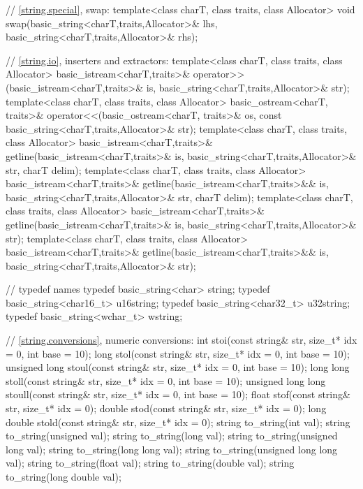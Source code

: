 \begin{codeblock}
{  // \ref{string.special}, swap:
  template<class charT, class traits, class Allocator>
    void swap(basic_string<charT,traits,Allocator>& lhs,
      basic_string<charT,traits,Allocator>& rhs);

  // \ref{string.io}, inserters and extractors:
  template<class charT, class traits, class Allocator>
    basic_istream<charT,traits>&
      operator>>(basic_istream<charT,traits>& is,
                 basic_string<charT,traits,Allocator>& str);
  template<class charT, class traits, class Allocator>
    basic_ostream<charT, traits>&
      operator<<(basic_ostream<charT, traits>& os,
                 const basic_string<charT,traits,Allocator>& str);
  template<class charT, class traits, class Allocator>
    basic_istream<charT,traits>&
      getline(basic_istream<charT,traits>& is,
              basic_string<charT,traits,Allocator>& str,
              charT delim);
  template<class charT, class traits, class Allocator>
    basic_istream<charT,traits>&
      getline(basic_istream<charT,traits>&& is,
              basic_string<charT,traits,Allocator>& str,
              charT delim);
  template<class charT, class traits, class Allocator>
    basic_istream<charT,traits>&
      getline(basic_istream<charT,traits>& is,
              basic_string<charT,traits,Allocator>& str);
  template<class charT, class traits, class Allocator>
    basic_istream<charT,traits>&
      getline(basic_istream<charT,traits>&& is,
              basic_string<charT,traits,Allocator>& str);

  //  typedef names
  typedef basic_string<char> string;
  typedef basic_string<char16_t> u16string;
  typedef basic_string<char32_t> u32string;
  typedef basic_string<wchar_t> wstring;

  // \ref{string.conversions}, numeric conversions:
  int stoi(const string& str, size_t* idx = 0, int base = 10);
  long stol(const string& str, size_t* idx = 0, int base = 10);
  unsigned long stoul(const string& str, size_t* idx = 0, int base = 10);
  long long stoll(const string& str, size_t* idx = 0, int base = 10);
  unsigned long long stoull(const string& str, size_t* idx = 0, int base = 10);
  float stof(const string& str, size_t* idx = 0);
  double stod(const string& str, size_t* idx = 0);
  long double stold(const string& str, size_t* idx = 0);
  string to_string(int val);
  string to_string(unsigned val);
  string to_string(long val);
  string to_string(unsigned long val);
  string to_string(long long val);
  string to_string(unsigned long long val);
  string to_string(float val);
  string to_string(double val);
  string to_string(long double val);

}
\end{codeblock}

